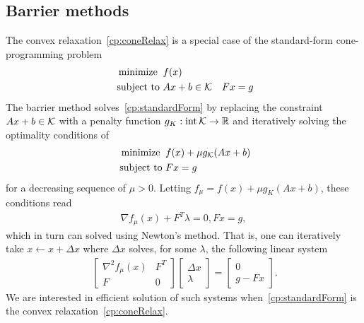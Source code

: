 \documentclass[letterpaper, 11pt]{article}
\begin{document}
\subsection{Barrier methods}
The convex relaxation~\eqref{cp:coneRelax} is a special case of the standard-form cone-programming problem
\begin{align}~\label{cp:standardForm}
  \begin{aligned}
    \operatorname*{minimize} \;\; &   f(x)\\
    \mbox{subject to } & Ax + b \in \mathcal{K}
                       & Fx = g
  \end{aligned}
\end{align}
The barrier method solves~\eqref{cp:standardForm} by
replacing the constraint $Ax + b \in \mathcal{K}$ with a penalty function  
$g_K : \operatorname*{int} \mathcal{K} \rightarrow \mathbb{R}$ and iteratively solving the optimality conditions of
\begin{align}~\label{qp:barrier}
  \begin{aligned}
    \operatorname*{minimize} \;\; &   f(x) + \mu g_{\mathcal{K}}(Ax+b) \\
    \mbox{subject to } 
                       & Fx = g
  \end{aligned}
\end{align}
for a decreasing sequence of $\mu > 0$.  
Letting $f_{\mu} = f(x) + \mu  g_K(Ax+b)$, these conditions read
\begin{align}\label{eq:barrier}
  \nabla f_{\mu}(x)+ F^T \lambda = 0, Fx = g,
\end{align}
which in turn can solved using  Newton's method. That is, one can iteratively take
$x \leftarrow x + \Delta x$ where $\Delta x$ solves, for some $\lambda$, the following linear system 
\begin{align}~\label{eq:kktsystem}
  \begin{bmatrix}
    \nabla^2 f_\mu(x)  & F^T  \\
    F  & 0 
  \end{bmatrix}
  \begin{bmatrix}
    \Delta x\\
    \lambda
  \end{bmatrix}
=
  \begin{bmatrix}
    0\\
   g - Fx
  \end{bmatrix}.
\end{align}
We are interested in efficient solution of such systems
when~\eqref{cp:standardForm} is the convex relaxation~\eqref{cp:coneRelax}.
\end{document}
